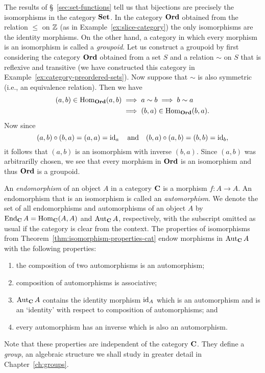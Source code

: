 \begin{example}
    The results of \S~\ref{sec:set-functions} tell us that bijections are
    precisely the isomorphisms in the category \(\mathbf{Set}\). In the category
    \(\mathbf{Ord}\) obtained from the relation \(\leq\) on \(\mathbb{Z}\) (as in
    Example~\ref{ex:slice-category}) the only isomorphisms are the identity
    morphisms. On the other hand, a category in which every morphism is an
    isomorphism is called a \emph{groupoid}. Let us construct a groupoid by
    first considering the category \(\mathbf{Ord}\) obtained from a set \(S\) and
    a relation \(\sim\) on \(S\) that is reflexive and transitive (we have
    constructed this category in Example~\ref{ex:category-preordered-sets}). Now
    suppose that \(\sim\) is also symmetric (i.e., an equivalence relation).
    Then we have
    \begin{align*}
    (a, b) \in \operatorname{Hom}_{\mathbf{Ord}}(a, b) &\implies a \sim b \implies b \sim a\\ &\implies (b, a) \in \operatorname{Hom}_{\mathbf{Ord}}(b, a).
    \end{align*}
    Now since
    \[
    (a, b) \circ (b, a) = (a, a) = \operatorname{id}_a \quad \text{and} \quad (b, a) \circ (a, b) = (b, b) = \operatorname{id}_b,
    \]
    it follows that \((a, b)\) is an isomorphism with inverse \((b, a)\). Since
    \((a, b)\) was arbitrarilly chosen, we see that every morphism in
    \(\mathbf{Ord}\) is an isomorphism and thus \(\mathbf{Ord}\) is a groupoid.
\end{example}

\begin{example}
    \label{ex:endomorphism-automorphism}
    An \emph{endomorphism} of an object \(A\) in a category \(\mathbf{C}\) is a
    morphism \(f: A \to A\). An endomorphism that is an isomorphism is called an
    \emph{automorphism}. We denote the set of all endomorphisms and
    automorphisms of an object \(A\) by \(\operatorname{End}_{\mathbf{C}}{A} =
    \operatorname{Hom}_{\mathbf{C}}(A,A)\) and \(\operatorname{Aut}_{\mathbf{C}}{A}\), respectively, with the
    subscript omitted as usual if the category is clear from the context. The
    properties of isomorphisms from Theorem~\ref{thm:isomorphism-properties-cat}
    endow morphisms in \(\operatorname{Aut}_{\mathbf{C}}{A}\) with the following properties:
    \begin{enumerate}[label=(\alph*), itemsep=0pt]
        \item the composition of two automorphisms is an automorphism;
        \item composition of automorphisms is associative;
        \item \(\operatorname{Aut}_{\mathbf{C}}{A}\) contains the identity morphism \(\operatorname{id}_A\) which is an automorphism and is an `identity' with respect to composition of automorphisms; and
        \item every automorphism has an inverse which is also an automorphism.
    \end{enumerate}
    Note that these properties are independent of the category \(\mathbf{C}\). They define a \emph{group}, an algebraic structure we shall study in greater detail in Chapter~\ref{ch:groups}.
\end{example}

